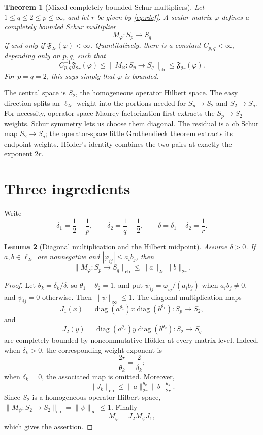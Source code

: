 \documentclass[11pt]{article}
\newtheorem{theorem}{Theorem}
\newtheorem{lemma}[theorem]{Lemma}
\newcommand{\cb}{\mathrm{cb}}
\newcommand{\diag}{\operatorname{diag}}
\newcommand{\F}{\mathfrak F}
\begin{document}
\begin{theorem}[Mixed completely bounded Schur multipliers]
\label{thm:main}
Let $1\le q\le2\le p\le\infty$, and let $r$ be given by
\eqref{eq:rdef}.  A scalar matrix $\varphi$ defines a completely bounded
Schur multiplier
\[
 M_\varphi:S_p\longrightarrow S_q
\]
if and only if $\F_{2r}(\varphi)<\infty$.  Quantitatively, there is a
constant $C_{p,q}<\infty$, depending only on $p,q$, such that
\begin{equation}\label{eq:norm-equivalence}
 C_{p,q}^{-1}\F_{2r}(\varphi)
 \le \|M_\varphi:S_p\to S_q\|_{\cb}
 \le \F_{2r}(\varphi).
\end{equation}
For $p=q=2$, this says simply that $\varphi$ is bounded.
\end{theorem}

The central space is $S_2$, the homogeneous operator Hilbert space.  The easy
direction splits an $\ell_{2r}$ weight into the portions needed for
$S_p\to S_2$ and $S_2\to S_q$.  For necessity, operator-space Maurey
factorization first extracts the $S_p\to S_2$ weights.  Schur symmetry lets us
choose them diagonal.  The residual is a cb Schur map $S_2\to S_q$; the
operator-space little Grothendieck theorem extracts its endpoint weights.
H\"older's identity combines the two pairs at exactly the exponent $2r$.

\section{Three ingredients}

Write
\begin{equation}\label{eq:deltas}
 \delta_1=\frac12-\frac1p,\qquad
 \delta_2=\frac1q-\frac12,\qquad
 \delta=\delta_1+\delta_2=\frac1r.
\end{equation}

\begin{lemma}[Diagonal multiplication and the Hilbert midpoint]
\label{lem:sufficiency}
Assume $\delta>0$.  If $a,b\in\ell_{2r}$ are nonnegative and
$|\varphi_{ij}|\le a_i b_j$, then
\[
 \|M_\varphi:S_p\to S_q\|_{\cb}
 \le \|a\|_{2r}\|b\|_{2r}.
\]
\end{lemma}

\begin{proof}
Let $\theta_k=\delta_k/\delta$, so $\theta_1+\theta_2=1$, and put
$\psi_{ij}=\varphi_{ij}/(a_i b_j)$ when $a_i b_j\ne0$, and $\psi_{ij}=0$
otherwise.  Then $\|\psi\|_\infty\le1$.  The diagonal multiplication maps
\[
 J_1(x)=\diag(a^{\theta_1})x\diag(b^{\theta_1}):S_p\to S_2,
\]
and
\[
 J_2(y)=\diag(a^{\theta_2})y\diag(b^{\theta_2}):S_2\to S_q
\]
are completely bounded by noncommutative H\"older at every matrix level.
Indeed, when $\delta_k>0$, the corresponding weight exponent is
\[
 \frac{2r}{\theta_k}=\frac2{\delta_k};
\]
when $\delta_k=0$, the associated map is omitted.  Moreover,
\[
 \|J_k\|_{\cb}\le
 \|a\|_{2r}^{\theta_k}\|b\|_{2r}^{\theta_k}.
\]
Since $S_2$ is a homogeneous operator Hilbert space,
$\|M_\psi:S_2\to S_2\|_{\cb}=\|\psi\|_\infty\le1$.  Finally
\[
 M_\varphi=J_2M_\psi J_1,
\]
which gives the assertion.
\end{proof}
\end{document}
